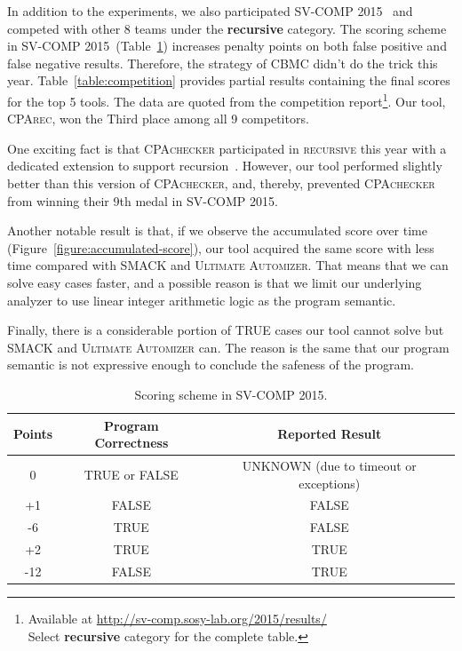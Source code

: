 In addition to the experiments, we also participated
SV-COMP 2015~\cite{svcomp15} and competed
with other 8 teams under the \textbf{recursive} category.
The scoring scheme in SV-COMP 2015~(Table~\ref{table:scoring-scheme-15})
increases penalty points on both false positive and false negative results.
Therefore, the strategy of \textsc{CBMC} didn't do the trick this year.
Table~\ref{table:competition} provides partial results containing the final
scores for the top 5 tools.
The data are quoted from the competition report\footnote{
  Available at \url{http://sv-comp.sosy-lab.org/2015/results/} \\
  Select \textbf{recursive} category for the complete table.
}.
Our tool, \textsc{CPArec}, won the Third place among all 9 competitors.

One exciting fact is that \textsc{CPAchecker} participated in \textsc{recursive}
this year with a dedicated extension to support recursion~\cite{DanglLW15}.
However, our tool performed slightly better than this version of
\textsc{CPAchecker},
and, thereby, prevented \textsc{CPAchecker} from winning their 9th medal in
SV-COMP 2015.


Another notable result is that, if we observe the accumulated score over time
(Figure~\ref{figure:accumulated-score}), our tool acquired the same score with
less time compared with \textsc{SMACK} and \textsc{Ultimate Automizer}.
That means that we can solve easy cases faster,
and a possible reason is that we limit our underlying analyzer to use
linear integer arithmetic logic as the program semantic.

Finally, there is a considerable portion of TRUE cases our tool cannot solve
but \textsc{SMACK} and \textsc{Ultimate Automizer} can.
The reason is the same that our program semantic is not expressive enough to
conclude the safeness of the program.


\begin{table}
\caption{Scoring scheme in SV-COMP 2015.\label{table:scoring-scheme-15}}
\begin{center}
\begin{tabular}{|c|c|c|}
\hline
Points & Program Correctness & Reported Result \\\hline
0      & TRUE or FALSE & UNKNOWN (due to timeout or exceptions) \\
+1     & FALSE         & FALSE \\
-6     & TRUE          & FALSE \\
+2     & TRUE          & TRUE \\
-12    & FALSE         & TRUE \\\hline
\end{tabular}
\end{center}
\end{table}


